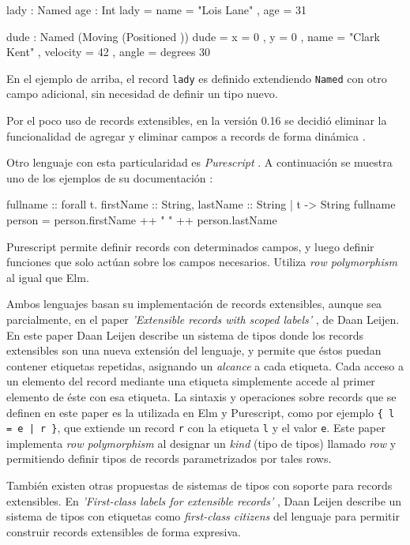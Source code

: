 \begin{code}
lady : Named { age : Int }
lady =
  { name = "Lois Lane"
  , age = 31 
  }

dude : Named (Moving (Positioned {}))
dude =
  { x = 0
  , y = 0
  , name = "Clark Kent"
  , velocity = 42
  , angle = degrees 30
  }
\end{code}

En el ejemplo de arriba, el record \texttt{lady} es definido extendiendo \texttt{Named} con otro campo adicional, sin necesidad de definir un tipo nuevo.

Por el poco uso de records extensibles, en la versión 0.16 se decidió eliminar la funcionalidad de agregar y eliminar campos a records de forma dinámica \cite{ElmReducedRecordSyntax}.

Otro lenguaje con esta particularidad es \textit{Purescript} \cite{PurescriptByExample}. A continuación se muestra uno de los ejemplos de su documentación \cite{PurescriptRecords}:

\begin{code}
fullname :: forall t. { firstName :: String,
  lastName :: String | t } -> String
fullname person = person.firstName ++ " " ++ person.lastName
\end{code}

Purescript permite definir records con determinados campos, y luego definir funciones que solo actúan sobre los campos necesarios. Utiliza \textit{row polymorphism} al igual que Elm.

Ambos lenguajes basan su implementación de records extensibles, aunque sea parcialmente, en el paper \textit{'Extensible records with scoped labels'} \cite{Leijen:scopedlabels}, de Daan Leijen. En este paper Daan Leijen describe un sistema de tipos donde los records extensibles son una nueva extensión del lenguaje, y permite que éstos puedan contener etiquetas repetidas, asignando un \textit{alcance} a cada etiqueta. Cada acceso a un elemento del record mediante una etiqueta simplemente accede al primer elemento de éste con esa etiqueta. La sintaxis y operaciones sobre records que se definen en este paper es la utilizada en Elm y Purescript, como por ejemplo \texttt{\{ l = e | r \}}, que extiende un record \texttt{r} con la etiqueta \texttt{l} y el valor \texttt{e}. Este paper implementa \textit{row polymorphism} al designar un \textit{kind} (tipo de tipos) llamado \textit{row} y permitiendo definir tipos de records parametrizados por tales rows.

También existen otras propuestas de sistemas de tipos con soporte para records extensibles. En \textit{'First-class labels for extensible records'} \cite{Leijen:fclabels}, Daan Leijen describe un sistema de tipos con etiquetas como \textit{first-class citizens} del lenguaje para permitir construir records extensibles de forma expresiva. 

